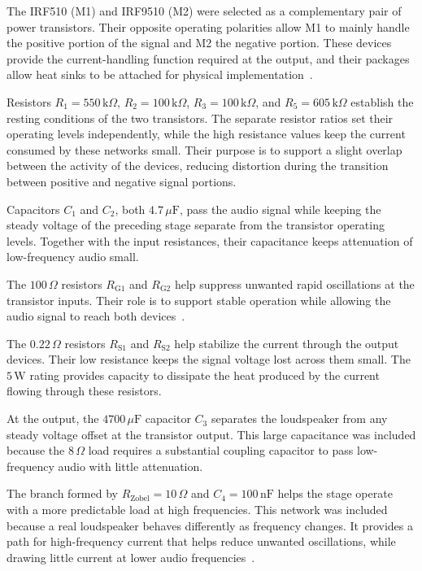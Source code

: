 \documentclass[conference]{IEEEtran}
\begin{document}
The IRF510 (M1) and IRF9510 (M2) were selected as a complementary pair of power transistors. Their opposite operating polarities allow M1 to mainly handle the positive portion of the signal and M2 the negative portion. These devices provide the current-handling function required at the output, and their packages allow heat sinks to be attached for physical implementation~\cite{irf510,irf9510}.

Resistors $R_1=550\,\mathrm{k}\Omega$, $R_2=100\,\mathrm{k}\Omega$, $R_3=100\,\mathrm{k}\Omega$, and $R_5=605\,\mathrm{k}\Omega$ establish the resting conditions of the two transistors. The separate resistor ratios set their operating levels independently, while the high resistance values keep the current consumed by these networks small. Their purpose is to support a slight overlap between the activity of the devices, reducing distortion during the transition between positive and negative signal portions.

Capacitors $C_1$ and $C_2$, both $4.7\,\mu\mathrm{F}$, pass the audio signal while keeping the steady voltage of the preceding stage separate from the transistor operating levels. Together with the input resistances, their capacitance keeps attenuation of low-frequency audio small.

The $100\,\Omega$ resistors $R_{\mathrm{G1}}$ and $R_{\mathrm{G2}}$ help suppress unwanted rapid oscillations at the transistor inputs. Their role is to support stable operation while allowing the audio signal to reach both devices~\cite{mosfet_audio}.

The $0.22\,\Omega$ resistors $R_{\mathrm{S1}}$ and $R_{\mathrm{S2}}$ help stabilize the current through the output devices. Their low resistance keeps the signal voltage lost across them small. The $5\,\mathrm{W}$ rating provides capacity to dissipate the heat produced by the current flowing through these resistors.

At the output, the $4700\,\mu\mathrm{F}$ capacitor $C_3$ separates the loudspeaker from any steady voltage offset at the transistor output. This large capacitance was included because the $8\,\Omega$ load requires a substantial coupling capacitor to pass low-frequency audio with little attenuation.

The branch formed by $R_{\mathrm{Zobel}}=10\,\Omega$ and $C_4=100\,\mathrm{nF}$ helps the stage operate with a more predictable load at high frequencies. This network was included because a real loudspeaker behaves differently as frequency changes. It provides a path for high-frequency current that helps reduce unwanted oscillations, while drawing little current at lower audio frequencies~\cite{mosfet_audio}.
\end{document}
